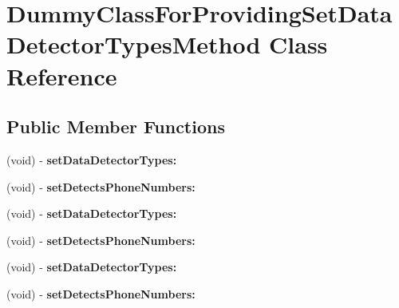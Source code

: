 \hypertarget{interface_dummy_class_for_providing_set_data_detector_types_method}{
\section{\-Dummy\-Class\-For\-Providing\-Set\-Data\-Detector\-Types\-Method \-Class \-Reference}
\label{interface_dummy_class_for_providing_set_data_detector_types_method}
}
\subsection*{\-Public \-Member \-Functions}
\begin{DoxyCompactItemize}
\item 
\hypertarget{interface_dummy_class_for_providing_set_data_detector_types_method_ae1e9f3deeb1f9506cfbc062c0cb035b7}{
(void) -\/ {\bfseries set\-Data\-Detector\-Types\-:}}
\label{interface_dummy_class_for_providing_set_data_detector_types_method_ae1e9f3deeb1f9506cfbc062c0cb035b7}

\item 
\hypertarget{interface_dummy_class_for_providing_set_data_detector_types_method_a17a6cdf3a1a13f82e85712986088408a}{
(void) -\/ {\bfseries set\-Detects\-Phone\-Numbers\-:}}
\label{interface_dummy_class_for_providing_set_data_detector_types_method_a17a6cdf3a1a13f82e85712986088408a}

\item 
\hypertarget{interface_dummy_class_for_providing_set_data_detector_types_method_ae1e9f3deeb1f9506cfbc062c0cb035b7}{
(void) -\/ {\bfseries set\-Data\-Detector\-Types\-:}}
\label{interface_dummy_class_for_providing_set_data_detector_types_method_ae1e9f3deeb1f9506cfbc062c0cb035b7}

\item 
\hypertarget{interface_dummy_class_for_providing_set_data_detector_types_method_a17a6cdf3a1a13f82e85712986088408a}{
(void) -\/ {\bfseries set\-Detects\-Phone\-Numbers\-:}}
\label{interface_dummy_class_for_providing_set_data_detector_types_method_a17a6cdf3a1a13f82e85712986088408a}

\item 
\hypertarget{interface_dummy_class_for_providing_set_data_detector_types_method_ae1e9f3deeb1f9506cfbc062c0cb035b7}{
(void) -\/ {\bfseries set\-Data\-Detector\-Types\-:}}
\label{interface_dummy_class_for_providing_set_data_detector_types_method_ae1e9f3deeb1f9506cfbc062c0cb035b7}

\item 
\hypertarget{interface_dummy_class_for_providing_set_data_detector_types_method_a17a6cdf3a1a13f82e85712986088408a}{
(void) -\/ {\bfseries set\-Detects\-Phone\-Numbers\-:}}
\label{interface_dummy_class_for_providing_set_data_detector_types_method_a17a6cdf3a1a13f82e85712986088408a}

\end{DoxyCompactItemize}


